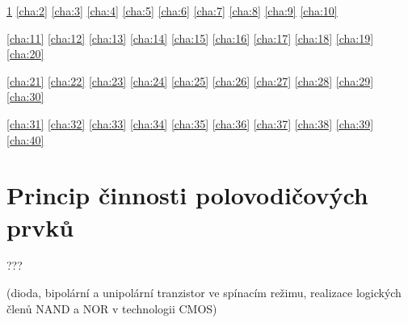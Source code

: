 \documentclass[a4paper, 11pt]{report}
\begin{document}
\ref{cha:1}
\ref{cha:2}
\ref{cha:3}
\ref{cha:4}
\ref{cha:5}
\ref{cha:6}
\ref{cha:7}
\ref{cha:8}
\ref{cha:9}
\ref{cha:10}

\ref{cha:11}
\ref{cha:12}
\ref{cha:13}
\ref{cha:14}
\ref{cha:15}
\ref{cha:16}
\ref{cha:17}
\ref{cha:18}
\ref{cha:19}
\ref{cha:20}

\ref{cha:21}
\ref{cha:22}
\ref{cha:23}
\ref{cha:24}
\ref{cha:25}
\ref{cha:26}
\ref{cha:27}
\ref{cha:28}
\ref{cha:29}
\ref{cha:30}

\ref{cha:31}
\ref{cha:32}
\ref{cha:33}
\ref{cha:34}
\ref{cha:35}
\ref{cha:36}
\ref{cha:37}
\ref{cha:38}
\ref{cha:39}
\ref{cha:40}

\newpage

\tableofcontents


\chapter{Princip činnosti polovodičových prvků} \label{cha:1}

???

(dioda, bipolární a unipolární tranzistor ve spínacím režimu, realizace logických členů NAND a NOR v technologii CMOS)
\end{document}
